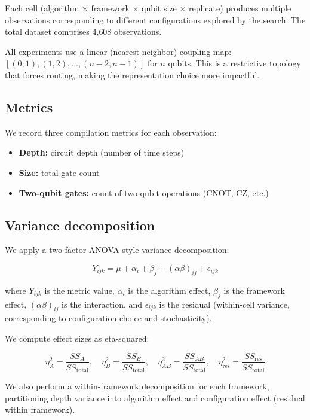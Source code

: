 \documentclass[11pt,a4paper]{article}
\begin{document}
Each cell (algorithm $\times$ framework $\times$ qubit size $\times$ replicate) produces multiple observations corresponding to different configurations explored by the search. The total dataset comprises 4{,}608 observations.

All experiments use a linear (nearest-neighbor) coupling map: $[(0,1), (1,2), \ldots, (n-2, n-1)]$ for $n$ qubits. This is a restrictive topology that forces routing, making the representation choice more impactful.

\subsection{Metrics}

We record three compilation metrics for each observation:

\begin{itemize}[noitemsep]
\item \textbf{Depth:} circuit depth (number of time steps)
\item \textbf{Size:} total gate count
\item \textbf{Two-qubit gates:} count of two-qubit operations (CNOT, CZ, etc.)
\end{itemize}

\subsection{Variance decomposition}

We apply a two-factor ANOVA-style variance decomposition:

$$Y_{ijk} = \mu + \alpha_i + \beta_j + (\alpha\beta)_{ij} + \epsilon_{ijk}$$

where $Y_{ijk}$ is the metric value, $\alpha_i$ is the algorithm effect, $\beta_j$ is the framework effect, $(\alpha\beta)_{ij}$ is the interaction, and $\epsilon_{ijk}$ is the residual (within-cell variance, corresponding to configuration choice and stochasticity).

We compute effect sizes as eta-squared:

$$\eta^2_A = \frac{SS_A}{SS_{\text{total}}}, \quad \eta^2_B = \frac{SS_B}{SS_{\text{total}}}, \quad \eta^2_{AB} = \frac{SS_{AB}}{SS_{\text{total}}}, \quad \eta^2_{\text{res}} = \frac{SS_{\text{res}}}{SS_{\text{total}}}$$

We also perform a within-framework decomposition for each framework, partitioning depth variance into algorithm effect and configuration effect (residual within framework).
\end{document}
